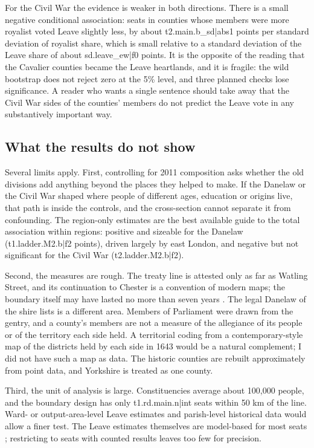 \documentclass[11pt,a4paper]{article}
\begin{document}
For the Civil War the evidence is weaker in both directions. There is a small negative conditional association: seats in counties whose members were more royalist voted Leave slightly less, by about {{t2.main.b_sd|abs1}} points per standard deviation of royalist share, which is small relative to a standard deviation of the Leave share of about {{sd.leave_ew|f0}} points. It is the opposite of the reading that the Cavalier counties became the Leave heartlands, and it is fragile: the wild bootstrap does not reject zero at the 5\% level, and three planned checks lose significance. A reader who wants a single sentence should take away that the Civil War sides of the counties' members do not predict the Leave vote in any substantively important way.

\subsection{What the results do not show}
Several limits apply. First, controlling for 2011 composition asks whether the old divisions add anything beyond the places they helped to make. If the Danelaw or the Civil War shaped where people of different ages, education or origins live, that path is inside the controls, and the cross-section cannot separate it from confounding. The region-only estimates are the best available guide to the total association within regions: positive and sizeable for the Danelaw ({{t1.ladder.M2.b|f2}} points), driven largely by east London, and negative but not significant for the Civil War ({{t2.ladder.M2.b|f2}}).

Second, the measures are rough. The treaty line is attested only as far as Watling Street, and its continuation to Chester is a convention of modern maps; the boundary itself may have lasted no more than seven years \citep{rochester2023}. The legal Danelaw of the shire lists is a different area. Members of Parliament were drawn from the gentry, and a county's members are not a measure of the allegiance of its people or of the territory each side held. A territorial coding from a contemporary-style map of the districts held by each side in 1643 \citep{gardiner1914} would be a natural complement; I did not have such a map as data. The historic counties are rebuilt approximately from point data, and Yorkshire is treated as one county.

Third, the unit of analysis is large. Constituencies average about 100,000 people, and the boundary design has only {{t1.rd.main.n|int}} seats within 50 km of the line. Ward- or output-area-level Leave estimates and parish-level historical data would allow a finer test. The Leave estimates themselves are model-based for most seats \citep{hanretty2017}; restricting to seats with counted results leaves too few for precision.
\end{document}
